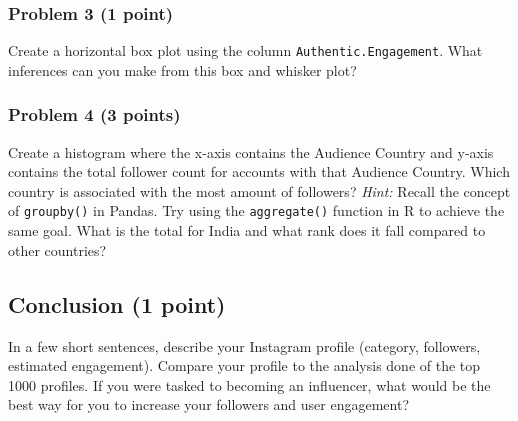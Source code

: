 \documentclass[
]{article}
\begin{document}
\hypertarget{problem-3-1-point}{%
\subsubsection{Problem 3 (1 point)}\label{problem-3-1-point}}

Create a horizontal box plot using the column
\texttt{Authentic.Engagement}. What inferences can you make from this
box and whisker plot?

\hypertarget{problem-4-3-points}{%
\subsubsection{Problem 4 (3 points)}\label{problem-4-3-points}}

Create a histogram where the x-axis contains the Audience Country and
y-axis contains the total follower count for accounts with that Audience
Country. Which country is associated with the most amount of followers?
\emph{Hint:} Recall the concept of \texttt{groupby()} in Pandas. Try
using the \texttt{aggregate()} function in R to achieve the same goal.
What is the total for India and what rank does it fall compared to other
countries?

\hypertarget{conclusion-1-point}{%
\subsection{Conclusion (1 point)}\label{conclusion-1-point}}

In a few short sentences, describe your Instagram profile (category,
followers, estimated engagement). Compare your profile to the analysis
done of the top 1000 profiles. If you were tasked to becoming an
influencer, what would be the best way for you to increase your
followers and user engagement?
\end{document}
